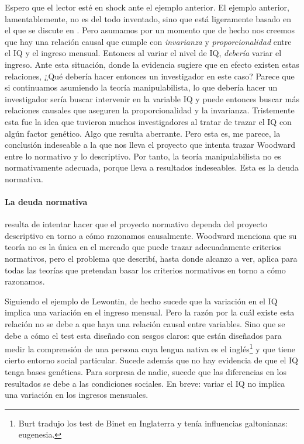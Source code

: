 Espero que el lector esté en shock ante el ejemplo anterior.
El ejemplo anterior, lamentablemente, no es del todo
inventado, sino que está ligeramente basado en el que se
discute en \parencite{Lewontin2017}. Pero asumamos por un
momento que de hecho nos creemos que hay una relación causal
que cumple con \emph{invarianza} y \emph{proporcionalidad}
entre el IQ y el ingreso mensual. Entonces al variar el
nivel de IQ, \emph{debería} variar el ingreso. Ante esta
situación, donde la evidencia sugiere que en efecto existen
estas relaciones, ¿Qué debería hacer entonces un
investigador en este caso? Parece que si continuamos
asumiendo la teoría manipulabilista, lo que debería hacer un
investigador sería buscar intervenir en la variable IQ y
puede entonces buscar más relaciones causales que aseguren
la proporcionalidad y la invarianza. Tristemente esta fue la
idea que tuvieron muchos investigadores al tratar de trazar
el IQ con algún factor genético. Algo que resulta aberrante.
Pero esta es, me parece, la conclusión indeseable a la que
nos lleva el proyecto que intenta trazar Woodward entre lo
normativo y lo descriptivo. Por tanto, la teoría
manipulabilista no es normativamente adecuada, porque lleva
a resultados indeseables. Esta es la deuda normativa.


\paragraph{La deuda normativa} resulta de intentar hacer que
el proyecto normativo dependa del proyecto descriptivo en
torno a cómo razonamos causalmente. Woodward menciona que su
teoría no es la única en el mercado que puede trazar
adecuadamente criterios normativos, pero el problema que
describí, hasta donde alcanzo a ver, aplica para todas las
teorías que pretendan basar los criterios normativos en
torno a cómo razonamos. 

Siguiendo el ejemplo de Lewontin, de hecho sucede que la
variación en el IQ implica una variación en el ingreso
mensual. Pero la razón por la cuál existe esta relación no
se debe a que haya una relación causal entre variables. Sino
que se debe a cómo el test esta diseñado con sesgos claros:
que están diseñados para medir la comprensión de una persona
cuya lengua nativa es el inglés\footnote{ 
  Burt tradujo los test de Binet en Inglaterra y tenía
  influencias galtonianas: eugenesia.
} 
y que tiene cierto entorno social particular. Sucede además
que no hay evidencia de que el IQ tenga bases genéticas.
Para sorpresa de nadie, sucede que las diferencias en los 
resultados se debe a las condiciones sociales. En
breve: variar el IQ no implica una variación en los ingresos
mensuales. 

